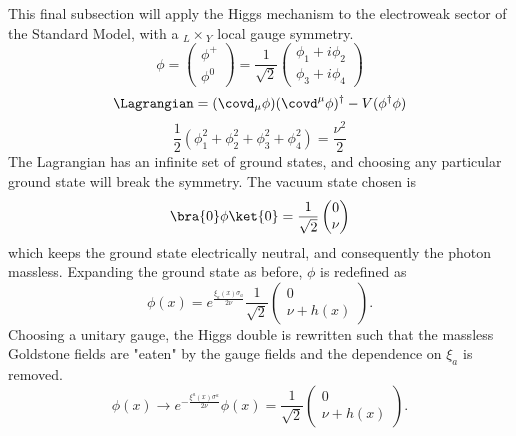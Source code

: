 This final subsection will apply the Higgs mechanism to the electroweak sector of the Standard Model, with a $_L\times$$_Y$ local gauge symmetry. 
\begin{equation}
    \phi=
    \begin{pmatrix}
         \phi^+ \\
         \phi^0
    \end{pmatrix}
    =\dfrac{1}{\sqrt{2}}
    \begin{pmatrix}
         \phi_1+i\phi_2\\
         \phi_3+i\phi_4
    \end{pmatrix}
\end{equation}
\begin{equation} \label{eq:higgsLagr}
    \Lagrangian=(\covd_{\mu}\phi)(\covd^{\mu}\phi)^{\dagger}-V(\phi^{\dagger}\phi)
\end{equation}
\begin{equation}
    \dfrac{1}{2}(\phi_{1}^2+\phi_{2}^2+\phi_{3}^2+\phi_{4}^2)=\dfrac{\nu^2}{2}
\end{equation}
The Lagrangian has an infinite set of ground states, and choosing any particular ground state will break the symmetry. The vacuum state chosen is
\begin{equation}
    \bra{0}\phi\ket{0}=\dfrac{1}{\sqrt{2}}
    \begin{pmatrix}
         0 \\
         \nu
    \end{pmatrix}
\end{equation}
which keeps the ground state electrically neutral, and consequently the photon massless. Expanding the ground state as before, $\phi$ is redefined as 
\begin{equation}
    \phi(x) = e^{\frac{\xi_a(x)\sigma_a}{2\nu}}\dfrac{1}{\sqrt{2}}
    \begin{pmatrix}
         0\\
         \nu+h(x)
    \end{pmatrix}.
\end{equation}
Choosing a unitary gauge, the Higgs double is rewritten such that the massless Goldstone fields are "eaten" by the gauge fields and the dependence on $\xi_a$ is removed.
\begin{equation} \label{eq:higgsvev}
    \phi(x)\rightarrow e^{-\frac{\xi^a(x)\sigma^a}{2\nu}}\phi(x)=\dfrac{1}{\sqrt{2}}
    \begin{pmatrix}
         0\\
         \nu+h(x)
    \end{pmatrix}.
\end{equation}
